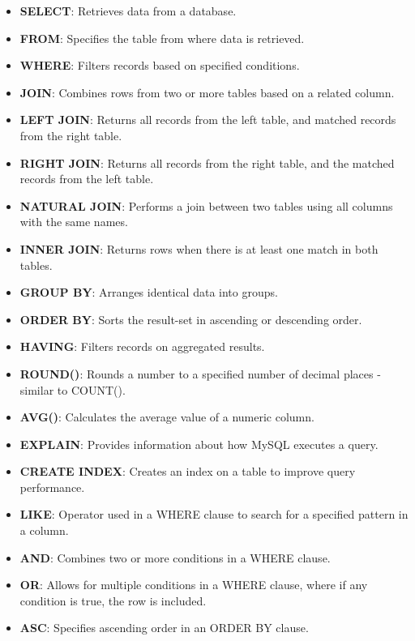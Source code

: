 \vspace{-0.15cm}

\begin{itemize}[noitemsep,leftmargin=*]
    \leftskip-\dimexpr\leftmargin %
    \item[]{\textbf{SELECT}: Retrieves data from a database.}
    \item[]{\textbf{FROM}: Specifies the table from where data is retrieved.}
    \item[]{\textbf{WHERE}: Filters records based on specified conditions.}
    \item[]{\textbf{JOIN}: Combines rows from two or more tables based on a related column.}
    \item[]{\textbf{LEFT JOIN}: Returns all records from the left table, and matched records from the right table.}
    \item[]{\textbf{RIGHT JOIN}: Returns all records from the right table, and the matched records from the left table.}
    \item[]{\textbf{NATURAL JOIN}: Performs a join between two tables using all columns with the same names.}
    \item[]{\textbf{INNER JOIN}: Returns rows when there is at least one match in both tables.}
    \item[]{\textbf{GROUP BY}: Arranges identical data into groups.}
    \item[]{\textbf{ORDER BY}: Sorts the result-set in ascending or descending order.}
    \item[]{\textbf{HAVING}: Filters records on aggregated results.}
    \item[]{\textbf{ROUND()}: Rounds a number to a specified number of decimal places - similar to COUNT().}
    \item[]{\textbf{AVG()}: Calculates the average value of a numeric column.}
    \item[]{\textbf{EXPLAIN}: Provides information about how MySQL executes a query.}
    \item[]{\textbf{CREATE INDEX}: Creates an index on a table to improve query performance.}
    \item[]{\textbf{LIKE}: Operator used in a WHERE clause to search for a specified pattern in a column.}
    \item[]{\textbf{AND}: Combines two or more conditions in a WHERE clause.}
    \item[]{\textbf{OR}: Allows for multiple conditions in a WHERE clause, where if any condition is true, the row is included.}
    \item[]{\textbf{ASC}: Specifies ascending order in an ORDER BY clause.}

\end{itemize}
